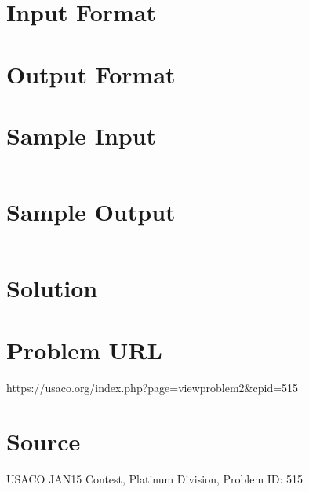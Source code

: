 \documentclass[12pt]{article}
\begin{document}
\section*{Input Format}


\section*{Output Format}


\section*{Sample Input}
\begin{verbatim}

\end{verbatim}

\section*{Sample Output}
\begin{verbatim}

\end{verbatim}

\section*{Solution}


\section*{Problem URL}
https://usaco.org/index.php?page=viewproblem2&cpid=515

\section*{Source}
USACO JAN15 Contest, Platinum Division, Problem ID: 515
\end{document}
